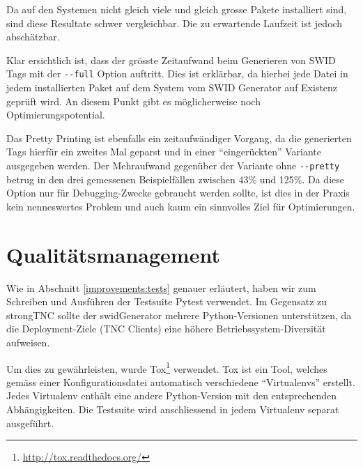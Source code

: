 Da auf den Systemen nicht gleich viele und gleich grosse Pakete installiert
sind, sind diese Resultate schwer vergleichbar. Die zu erwartende Laufzeit ist jedoch abschätzbar.

Klar ersichtlich ist, dass der grösste Zeitaufwand beim Generieren von SWID Tags
mit der \texttt{-{}-full} Option auftritt. Dies ist erklärbar, da hierbei jede
Datei in jedem installierten Paket auf dem System vom SWID Generator auf
Existenz geprüft wird. An diesem Punkt gibt es möglicherweise noch
Optimierungspotential.

Das Pretty Printing ist ebenfalls ein zeitaufwändiger Vorgang, da die
generierten Tags hierfür ein zweites Mal geparst und in einer
\enquote{eingerückten} Variante ausgegeben werden. Der Mehraufwand gegenüber
der Variante ohne \texttt{-{}-pretty} betrug in den drei gemessenen
Beispielfällen zwischen 43\% und 125\%. Da diese Option nur für Debugging-Zwecke
gebraucht werden sollte, ist dies in der Praxis kein nenneswertes Problem und
auch kaum ein sinnvolles Ziel für Optimierungen.




\section{Qualitätsmanagement}
\label{swidgenerator:architektur:qa}

Wie in Abschnitt \ref{improvements:tests} genauer erläutert, haben wir zum
Schreiben und Ausführen der Testsuite Pytest verwendet. Im Gegensatz zu
strongTNC sollte der swidGenerator mehrere Python-Versionen unterstützen, da die
Deployment-Ziele (TNC Clients) eine höhere Betriebssystem-Diversität aufweisen.

Um dies zu gewährleisten, wurde Tox\footnote{\url{http://tox.readthedocs.org/}}
verwendet. Tox ist ein Tool, welches gemäss einer Konfigurationsdatei
automatisch verschiedene \enquote{Virtualenvs} erstellt. Jedes Virtualenv
enthält eine andere Python-Version mit den entsprechenden Abhängigkeiten. Die
Testsuite wird anschliessend in jedem Virtualenv separat ausgeführt.


